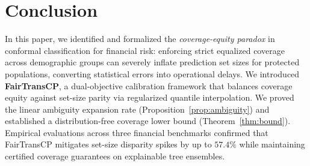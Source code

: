 \documentclass[conference]{IEEEtran}
\begin{document}
\section{Conclusion}
In this paper, we identified and formalized the \emph{coverage-equity paradox} in conformal classification for financial risk: enforcing strict equalized coverage across demographic groups can severely inflate prediction set sizes for protected populations, converting statistical errors into operational delays. We introduced \textbf{FairTransCP}, a dual-objective calibration framework that balances coverage equity against set-size parity via regularized quantile interpolation. We proved the linear ambiguity expansion rate (Proposition~\ref{prop:ambiguity}) and established a distribution-free coverage lower bound (Theorem~\ref{thm:bound}). Empirical evaluations across three financial benchmarks confirmed that FairTransCP mitigates set-size disparity spikes by up to $57.4\%$ while maintaining certified coverage guarantees on explainable tree ensembles.
\end{document}
